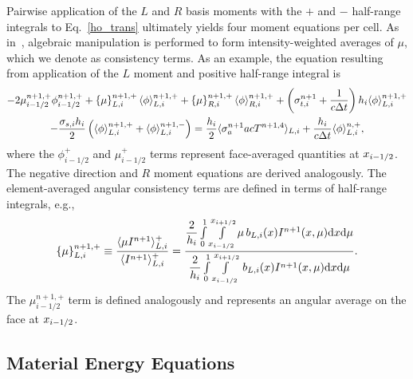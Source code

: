 Pairwise application of the $L$ and $R$ basis
moments with the $+$ and $-$ half-range integrals to Eq.~\eqref{ho_trans} 
ultimately yields four moment
equations per cell. As in~\cite{wolters}, algebraic manipulation is performed to form
intensity-weighted
averages of $\mu$, which we denote as consistency terms.  As an example, the equation resulting from application of the $L$ moment and
positive half-range integral is
\begin{multline}\label{eq:lo_tran}
    -2{\mu}_{i-1/2}^{n+1,+} \phi_{i-1/2}^{n+1,+} + \left\{ \mu \right\}_{L,i}^{n+1,+}
  \langle \phi \rangle_{L,i}^{n+1,+}
  +  \left\{ \mu \right\}_{R,i}^{n+1,+}
  \langle \phi \rangle_{R,i}^{n+1,+} +  \left(\sigma_{t,i}^{n+1}+\frac{1}{c \Delta t} \right) h_i 
  \langle \phi \rangle_{L,i}^{n+1,+} \\-  \frac{\sigma_{s,i} h_i}{2} \left( \langle \phi \rangle_{L,i}^{n+1,+} +
  \langle \phi \rangle_{L,i}^{n+1,-}\right) = \frac{h_i}{2} \langle \sigma_a^{n+1} a c T^{n+1,4} \rangle_{L,i} +
  \frac{h_i}{c\Delta t}\langle \phi \rangle_{L,i}^{n,+},
\end{multline}
where the $\phi^+_{i-1/2}$ and $\mu^+_{i-1/2}$ terms represent face-averaged quantities at $x_{{i-1/2}}$.  The negative direction and $R$ moment equations are
derived analogously.  The element-averaged angular consistency terms are defined in terms of half-range integrals, e.g.,
\begin{equation}\label{const}
    \left\{ {\mu} \right\}_{L,i}^{n+1,+} \equiv \frac{\langle \mu I^{n+1} \rangle_{L,i}^+}{\langle I^{n+1} \rangle_{L,i}^+} =  \frac{
{\displaystyle \frac{2}{h_i}} \int\limits_0^1 \int\limits_{x_{i-1/2}}^{x_{i+1/2}} \mu \, b_{L,i}(x)
I^{n+1}(x,\mu) \mathrm{d} x \mathrm{d} \mu } 
{{\displaystyle \frac{2}{h_i}} \int\limits_0^1 \int\limits_{x_{i-1/2}}^{x_{i+1/2}} \, b_{L,i}(x)
I^{n+1}(x,\mu) \mathrm{d} x \mathrm{d} \mu } .
\end{equation}
The $\mu_{i-1/2}^{n+1,+}$ term is defined analogously and represents an angular average on the face at $x_{{i-1/2}}$.

\subsection{Material Energy Equations}

